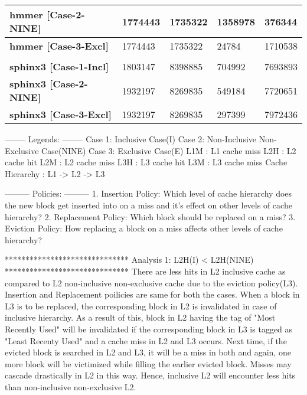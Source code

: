 \documentclass[12pt]{article}
\begin{document}
\begin{table}[]
{\begin{tabular}{|l|l|l|l|l|}
\textbf{hmmer    {[}Case-2-NINE{]}} & 1774443    & 1735322 & 1358978 & 376344  \\ \hline
\textbf{hmmer    {[}Case-3-Excl{]}} & 1774443    & 1735322 & 24784   & 1710538 \\ \hline
\textbf{}                           &            &         &         &         \\ \hline
\textbf{sphinx3  {[}Case-1-Incl{]}} & 1803147    & 8398885 & 704992  & 7693893 \\ \hline
\textbf{sphinx3  {[}Case-2-NINE{]}} & 1932197    & 8269835 & 549184  & 7720651 \\ \hline
\textbf{sphinx3  {[}Case-3-Excl{]}} & 1932197    & 8269835 & 297399  & 7972436 \\ \hline
\end{tabular}%
}
\end{table}

--------
Legends:
--------
Case 1: Inclusive Case(I)
Case 2: Non-Inclusive Non-Exclusive Case(NINE)
Case 3: Exclusive Case(E)
L1M : L1 cache miss
L2H : L2 cache hit
L2M : L2 cache miss
L3H : L3 cache hit
L3M : L3 cache miss
Cache Hierarchy : L1 -> L2 -> L3

---------
Policies:
---------
1. Insertion Policy: Which level of cache hierarchy does the new block get inserted into on a miss and it's effect on other levels of cache hierarchy?
2. Replacement Policy: Which block should be replaced on a miss?
3. Eviction Policy: How replacing a block on a miss affects other levels of cache hierarchy?

******************************
Analysis 1: L2H(I) < L2H(NINE)
******************************
There are less hits in L2 inclusive cache as compared to L2 non-inclusive non-exclusive cache due to the eviction policy(L3). Insertion and Replacement poilicies are same for both the cases. When a block in L3 is to be replaced, the corresponding block in L2 is invalidated in case of inclusive hierarchy. As a result of this, block in L2 having the tag of "Most Recently Used" will be invalidated if the corresponding block in L3 is tagged as "Least Recenty Used" and a cache miss in L2 and L3 occurs. Next time, if the evicted block is searched in L2 and L3, it will be a miss in both and again, one more block will be victimized while filling the earlier evicted block. Misses may cascade drastically in L2 in this way. Hence, inclusive L2 will encounter less hits than non-inclusive non-exclusive L2.
\end{document}
